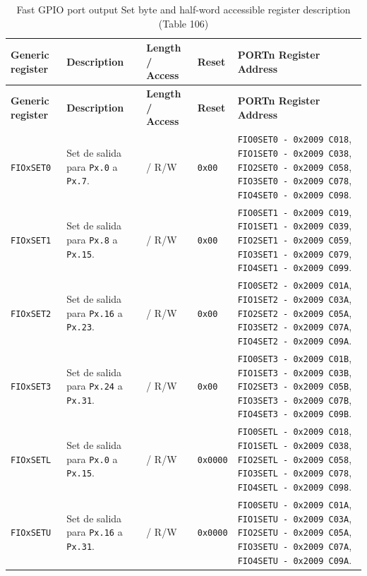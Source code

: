 \begin{longtable}{|>{\raggedright\arraybackslash}p{}|>{\raggedright\arraybackslash}p{}|>{\centering\arraybackslash}p{}|>{\centering\arraybackslash}p{}|>{\raggedright\arraybackslash}p{}|}
\caption{Fast GPIO port output Set byte and half-word accessible register description (Table 106)} \\
\hline
\textbf{Generic register} & \textbf{Description} & \textbf{Length / Access} & \textbf{Reset} & \textbf{PORTn Register Address} \\
\hline
\endfirsthead
\hline
\textbf{Generic register} & \textbf{Description} & \textbf{Length / Access} & \textbf{Reset} & \textbf{PORTn Register Address} \\
\hline
\endhead
\texttt{FIOxSET0} & Set de salida para \texttt{Px.0} a \texttt{Px.7}. & 8 / R/W & \texttt{0x00} & \texttt{FIO0SET0 - 0x2009 C018}, \texttt{FIO1SET0 - 0x2009 C038}, \texttt{FIO2SET0 - 0x2009 C058}, \texttt{FIO3SET0 - 0x2009 C078}, \texttt{FIO4SET0 - 0x2009 C098}. \\
\hline
\texttt{FIOxSET1} & Set de salida para \texttt{Px.8} a \texttt{Px.15}. & 8 / R/W & \texttt{0x00} & \texttt{FIO0SET1 - 0x2009 C019}, \texttt{FIO1SET1 - 0x2009 C039}, \texttt{FIO2SET1 - 0x2009 C059}, \texttt{FIO3SET1 - 0x2009 C079}, \texttt{FIO4SET1 - 0x2009 C099}. \\
\hline
\texttt{FIOxSET2} & Set de salida para \texttt{Px.16} a \texttt{Px.23}. & 8 / R/W & \texttt{0x00} & \texttt{FIO0SET2 - 0x2009 C01A}, \texttt{FIO1SET2 - 0x2009 C03A}, \texttt{FIO2SET2 - 0x2009 C05A}, \texttt{FIO3SET2 - 0x2009 C07A}, \texttt{FIO4SET2 - 0x2009 C09A}. \\
\hline
\texttt{FIOxSET3} & Set de salida para \texttt{Px.24} a \texttt{Px.31}. & 8 / R/W & \texttt{0x00} & \texttt{FIO0SET3 - 0x2009 C01B}, \texttt{FIO1SET3 - 0x2009 C03B}, \texttt{FIO2SET3 - 0x2009 C05B}, \texttt{FIO3SET3 - 0x2009 C07B}, \texttt{FIO4SET3 - 0x2009 C09B}. \\
\hline
\texttt{FIOxSETL} & Set de salida para \texttt{Px.0} a \texttt{Px.15}. & 16 / R/W & \texttt{0x0000} & \texttt{FIO0SETL - 0x2009 C018}, \texttt{FIO1SETL - 0x2009 C038}, \texttt{FIO2SETL - 0x2009 C058}, \texttt{FIO3SETL - 0x2009 C078}, \texttt{FIO4SETL - 0x2009 C098}. \\
\hline
\texttt{FIOxSETU} & Set de salida para \texttt{Px.16} a \texttt{Px.31}. & 16 / R/W & \texttt{0x0000} & \texttt{FIO0SETU - 0x2009 C01A}, \texttt{FIO1SETU - 0x2009 C03A}, \texttt{FIO2SETU - 0x2009 C05A}, \texttt{FIO3SETU - 0x2009 C07A}, \texttt{FIO4SETU - 0x2009 C09A}. \\
\hline
\end{longtable}

